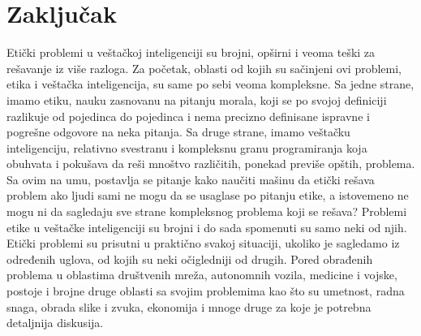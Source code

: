 \documentclass[a4paper]{article}
\begin{document}
\section{Zaključak}
\label{sec: Zaključak}
Etički problemi u veštačkoj inteligenciji su brojni, opširni i veoma teški za rešavanje iz više razloga. Za početak, oblasti od kojih su sačinjeni ovi problemi, etika i veštačka inteligencija, su same po sebi veoma kompleksne. Sa jedne strane, imamo etiku, nauku zasnovanu na pitanju morala, koji se po svojoj definiciji razlikuje od pojedinca do pojedinca i nema precizno definisane ispravne i pogrešne odgovore na neka pitanja. Sa druge strane, imamo veštačku inteligenciju, relativno svestranu i kompleksnu granu programiranja koja obuhvata i pokušava da reši mnoštvo različitih, ponekad previše opštih, problema. Sa ovim na umu, postavlja se pitanje kako naučiti mašinu da etički rešava problem ako ljudi sami ne mogu da se usaglase po pitanju etike, a istovemeno ne mogu ni da sagledaju sve strane kompleksnog problema koji se rešava?
Problemi etike u veštačke inteligenciji su brojni i do sada spomenuti su samo neki od njih. Etički problemi su prisutni u praktično svakoj situaciji, ukoliko je sagledamo iz određenih uglova, od kojih su neki očigledniji od drugih. Pored obrađenih problema u oblastima društvenih mreža, autonomnih vozila, medicine i vojske, postoje i brojne druge oblasti sa svojim problemima kao što su umetnost, radna snaga, obrada slike i zvuka, ekonomija i mnoge druge za koje je potrebna detaljnija diskusija.
\newpage
{}
\appendix
 

\appendix
\end{document}
